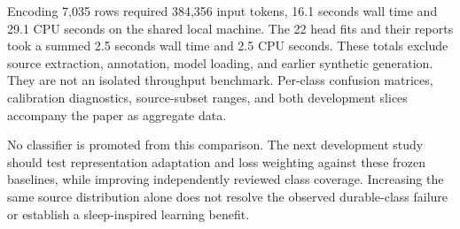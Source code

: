 Encoding 7,035 rows required 384,356 input tokens, 16.1 seconds wall time and
29.1 CPU seconds on the shared local machine. The 22 head fits and their reports
took a summed 2.5 seconds wall time and 2.5 CPU seconds. These totals exclude
source extraction, annotation, model loading, and earlier synthetic generation.
They are not an isolated throughput benchmark. Per-class confusion matrices,
calibration diagnostics, source-subset ranges, and both development slices
accompany the paper as aggregate data.

No classifier is promoted from this comparison. The next development study
should test representation adaptation and loss weighting against these frozen
baselines, while improving independently reviewed class coverage. Increasing
the same source distribution alone does not resolve the observed durable-class
failure or establish a sleep-inspired learning benefit.
